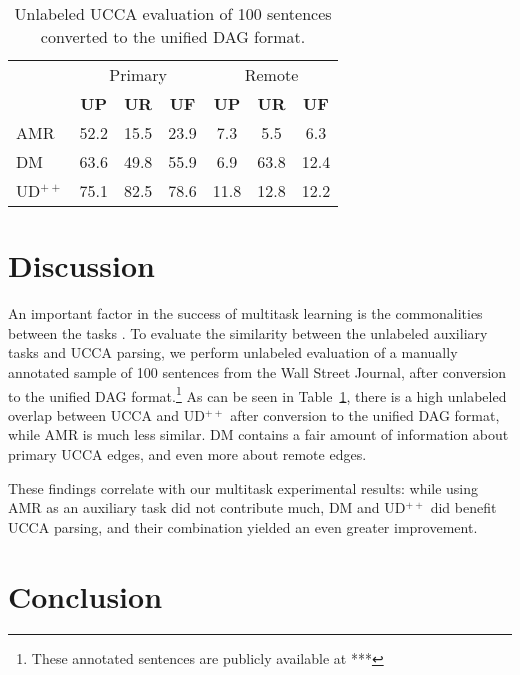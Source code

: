 \documentclass[11pt,a4paper]{article}
\begin{document}
\begin{table}
\begin{tabular}{lccc|ccc}
& \multicolumn{3}{c|}{\footnotesize Primary} & \multicolumn{3}{c}{\footnotesize Remote} \\
& \footnotesize \textbf{UP} & \footnotesize \textbf{UR} & \footnotesize \textbf{UF}
& \footnotesize \textbf{UP} & \footnotesize \textbf{UR} & \footnotesize \textbf{UF} \\
AMR & 52.2 & 15.5 & 23.9 & 7.3 & 5.5 & 6.3 \\
DM & 63.6 & 49.8 & 55.9 & 6.9 & 63.8 & 12.4 \\
UD$^{++}$ & 75.1 & 82.5 & 78.6 & 11.8 & 12.8 & 12.2
\end{tabular}
\caption{Unlabeled UCCA evaluation of 100 sentences converted to the unified DAG format.
\label{tab:common}}
\end{table}


\section{Discussion}\label{sec:discussion}

An important factor in the success of multitask learning is the commonalities between the tasks
\cite{E17-2026,E17-1005}.
To evaluate the similarity between the unlabeled auxiliary tasks and UCCA parsing,
we perform unlabeled evaluation of a manually annotated sample of 100 sentences from the
Wall Street Journal, after conversion to the unified DAG format.\footnote{These annotated
sentences are publicly available at ***}
As can be seen in Table~\ref{tab:common}, there is a high unlabeled overlap between
UCCA and UD$^{++}$ after conversion to the unified DAG format,
while AMR is much less similar.
DM contains a fair amount of information about primary UCCA edges, and even more about remote edges.

These findings correlate with our multitask experimental results:
while using AMR as an auxiliary task did not contribute much, DM and UD$^{++}$ did benefit UCCA
parsing, and their combination yielded an even greater improvement.

\section{Conclusion}




\end{document}
